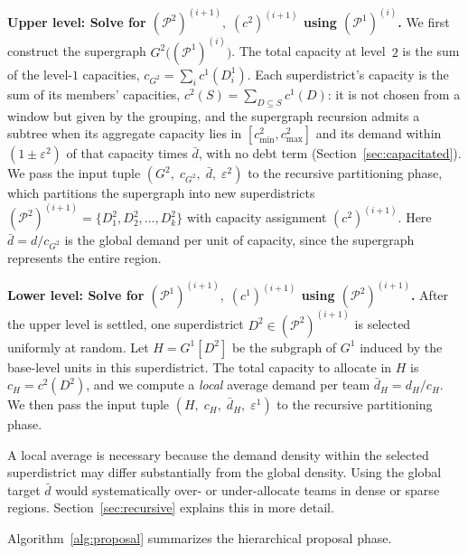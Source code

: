 \documentclass[preprint,12pt,authoryear]{elsarticle}
\theoremstyle{definition}
\begin{document}
\medskip
\noindent\textbf{Upper level: Solve for $(\mathcal{P}^2)^{(i+1)},\;
(c^2)^{(i+1)}$ using $(\mathcal{P}^1)^{(i)}$.}\quad
We first construct the supergraph $G^2\bigl((\mathcal{P}^1)^{(i)}\bigr)$.
The total capacity at level~$2$ is the sum of the level-$1$ capacities,
$c_{G^2} = \sum_i c^1(D_i^1)$. Each superdistrict's capacity is the sum of its members' capacities, $c^2(S) = \sum_{D \subseteq S} c^1(D)$: it is not chosen from a window but given by the grouping, and the supergraph recursion admits a subtree when its aggregate capacity lies in $[c^2_{\min}, c^2_{\max}]$ and its demand within $(1 \pm \varepsilon^2)$ of that capacity times $\bar d$, with no debt term (Section~\ref{sec:capacitated}).  We pass the
input tuple $(G^2,\; c_{G^2},\; \bar{d},\; \varepsilon^2)$ to the recursive
partitioning phase, which partitions the supergraph into new superdistricts
$(\mathcal{P}^2)^{(i+1)} = \{D_1^2, D_2^2, \ldots, D_k^2\}$ with capacity
assignment $(c^2)^{(i+1)}$.  Here $\bar{d} = d/c_{G^2}$ is the global demand per unit of capacity, since the supergraph represents the entire region.

\medskip
\noindent\textbf{Lower level: Solve for $(\mathcal{P}^1)^{(i+1)},\;
(c^1)^{(i+1)}$ using $(\mathcal{P}^2)^{(i+1)}$.}\quad
After the upper level is settled, one superdistrict
$D^2 \in (\mathcal{P}^2)^{(i+1)}$ is selected uniformly at random.  Let
$H = G^1[D^2]$ be the subgraph of $G^1$ induced by the base-level units in
this superdistrict.  The total capacity to allocate in $H$ is
$c_H = c^2(D^2)$, and we compute a \emph{local} average demand per team
$\bar{d}_H = d_H / c_H$.  We then pass the input tuple
$(H,\; c_H,\; \bar{d}_H,\; \varepsilon^1)$ to the recursive partitioning
phase.

A local average is necessary because the demand density within the selected superdistrict may differ substantially from the global density. Using the global target $\bar{d}$ would systematically over- or under-allocate teams in dense or sparse regions. Section~\ref{sec:recursive} explains this in more detail.

Algorithm~\ref{alg:proposal} summarizes the hierarchical proposal phase.

\medskip
\medskip
\end{document}
